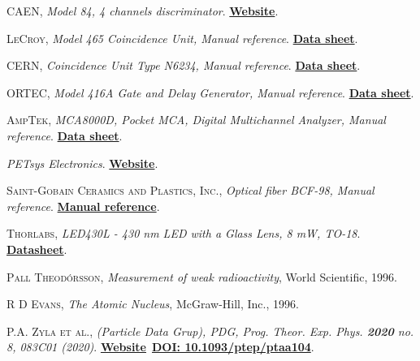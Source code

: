 \begin{thebibliography}{100}
 \textsc{CAEN},
\textit{Model 84, 4 channels discriminator}. \href{https://www.caen.it/}{\textbf{Website}}.

 \textsc{LeCroy},
\textit{Model 465 Coincidence Unit, Manual reference}. \href{https://prep.fnal.gov/catalog/hardware_info/lecroy/nim/465.html}{\textbf{Data sheet}}.

 \textsc{CERN},
\textit{Coincidence Unit Type N6234, Manual reference}. \href{}{\textbf{Data sheet}}.

 \textsc{ORTEC},
\textit{Model 416A Gate and Delay Generator, Manual reference}. \href{https://www.ortec-online.com/products/electronics/delays-gates-and-logic-modules/416a}{\textbf{Data sheet}}.

 \textsc{AmpTek},
\textit{MCA8000D, Pocket MCA, Digital Multichannel Analyzer, Manual reference}. \href{https://www.amptek.com/products/multichannel-analyzers/mca-8000d-digital-multichannel-analyzer}{\textbf{Data sheet}}.

 \textit{PETsys Electronics}. \href{https://www.petsyselectronics.com/web/private/login}{\textbf{Website}}.

 \textsc{Saint-Gobain Ceramics and Plastics, Inc.},
\textit{Optical fiber BCF-98, Manual reference}. \href{https://www.crystals.saint-gobain.com/products/scintillating-fiber}{\textbf{Manual reference}}.

 \textsc{Thorlabs},
\textit{LED430L - 430 nm LED with a Glass Lens, 8 mW, TO-18}. \href{https://www.thorlabs.com/thorproduct.cfm?partnumber=LED430L}{\textbf{Datasheet}}.

 \textsc{Pall Theodórsson},
\textit{Measurement of weak radioactivity}, World Scientific, 1996.

 \textsc{R D Evans},
\textit{The Atomic Nucleus}, McGraw-Hill, Inc., 1996.

 \textsc{P.A. Zyla et al.},
\textit{(Particle Data Grup), PDG, Prog. Theor. Exp. Phys. \textbf{2020} no. 8, 083C01 (2020)}. \href{https://pdg.lbl.gov/}{\textbf{Website}}~\href{https://academic.oup.com/ptep/article/2020/8/083C01/5891211}{\textbf{DOI: 10.1093/ptep/ptaa104}}.


\end{thebibliography}
